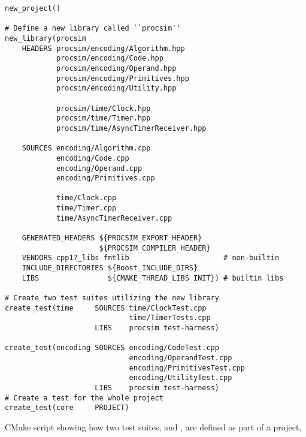 \begin{listing}[hp]
\begin{verbatim}
new_project()

# Define a new library called ``procsim''
new_library(procsim 
    HEADERS procsim/encoding/Algorithm.hpp
            procsim/encoding/Code.hpp
            procsim/encoding/Operand.hpp
            procsim/encoding/Primitives.hpp
            procsim/encoding/Utility.hpp
            
            procsim/time/Clock.hpp
            procsim/time/Timer.hpp
            procsim/time/AsyncTimerReceiver.hpp
    
    SOURCES encoding/Algorithm.cpp
            encoding/Code.cpp
            encoding/Operand.cpp
            encoding/Primitives.cpp
    
            time/Clock.cpp
            time/Timer.cpp
            time/AsyncTimerReceiver.cpp
    
    GENERATED_HEADERS ${PROCSIM_EXPORT_HEADER}
                      ${PROCSIM_COMPILER_HEADER}
    VENDORS cpp17_libs fmtlib                      # non-builtin
    INCLUDE_DIRECTORIES ${Boost_INCLUDE_DIRS}
    LIBS                ${CMAKE_THREAD_LIBS_INIT}) # builtin libs

# Create two test suites utilizing the new library      
create_test(time     SOURCES time/ClockTest.cpp 
                             time/TimerTests.cpp
                     LIBS    procsim test-harness)
                     
create_test(encoding SOURCES encoding/CodeTest.cpp
                             encoding/OperandTest.cpp
                             encoding/PrimitivesTest.cpp
                             encoding/UtilityTest.cpp
                     LIBS    procsim test-harness)
# Create a test for the whole project
create_test(core     PROJECT)
\end{verbatim}
\caption{CMake script showing how two test suites,  and , are defined as part of a project, }
\label{lst:cross-platform:cmake-test-declaration}
\end{listing}
 
